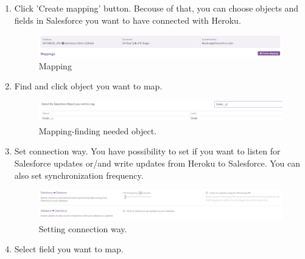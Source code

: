 \documentclass[12pt,a4paper]{article}
\begin{document}
\begin{enumerate}
\item Click 'Create mapping' button. Becouse of that, you can choose objects and fields in Salesforce you want to have connected with Heroku.
\begin{figure}[H]
	\centering
	\includegraphics[width=1\textwidth]{images/connect6.PNG}
	\caption{Mapping}
	\label{fig:conf}
\end{figure}

\item Find and click object you want to map.
\begin{figure}[H]
	\centering
	\includegraphics[width=1\textwidth]{images/connect7.PNG}
	\caption{Mapping-finding needed object.}
	\label{fig:cong}
\end{figure}

\item Set connection way. You have possibility to set if you want to listen for Salesforce updates or/and write updates from Heroku to Salesforce. You can also set synchronization frequency. 
\begin{figure}[H]
	\centering
	\includegraphics[width=1\textwidth]{images/connect8.PNG}
	\caption{Setting connection way.}
	\label{fig:conh}
\end{figure}

\item Select field you want to map. 


\end{enumerate}
\end{document}
